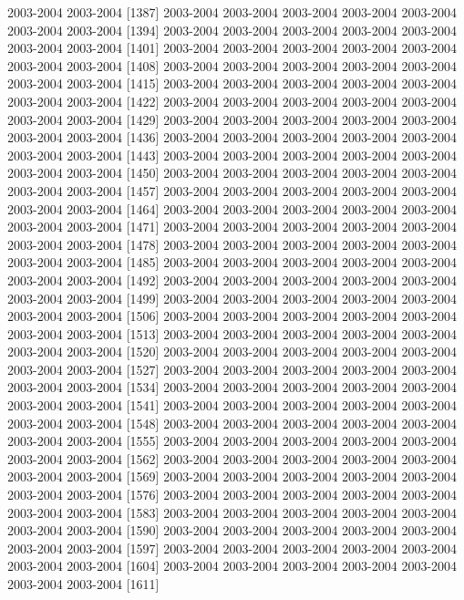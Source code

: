\documentclass[
]{article}
\begin{document}
2003-2004 2003-2004 {[}1387{]} 2003-2004 2003-2004 2003-2004 2003-2004
2003-2004 2003-2004 2003-2004 {[}1394{]} 2003-2004 2003-2004 2003-2004
2003-2004 2003-2004 2003-2004 2003-2004 {[}1401{]} 2003-2004 2003-2004
2003-2004 2003-2004 2003-2004 2003-2004 2003-2004 {[}1408{]} 2003-2004
2003-2004 2003-2004 2003-2004 2003-2004 2003-2004 2003-2004 {[}1415{]}
2003-2004 2003-2004 2003-2004 2003-2004 2003-2004 2003-2004 2003-2004
{[}1422{]} 2003-2004 2003-2004 2003-2004 2003-2004 2003-2004 2003-2004
2003-2004 {[}1429{]} 2003-2004 2003-2004 2003-2004 2003-2004 2003-2004
2003-2004 2003-2004 {[}1436{]} 2003-2004 2003-2004 2003-2004 2003-2004
2003-2004 2003-2004 2003-2004 {[}1443{]} 2003-2004 2003-2004 2003-2004
2003-2004 2003-2004 2003-2004 2003-2004 {[}1450{]} 2003-2004 2003-2004
2003-2004 2003-2004 2003-2004 2003-2004 2003-2004 {[}1457{]} 2003-2004
2003-2004 2003-2004 2003-2004 2003-2004 2003-2004 2003-2004 {[}1464{]}
2003-2004 2003-2004 2003-2004 2003-2004 2003-2004 2003-2004 2003-2004
{[}1471{]} 2003-2004 2003-2004 2003-2004 2003-2004 2003-2004 2003-2004
2003-2004 {[}1478{]} 2003-2004 2003-2004 2003-2004 2003-2004 2003-2004
2003-2004 2003-2004 {[}1485{]} 2003-2004 2003-2004 2003-2004 2003-2004
2003-2004 2003-2004 2003-2004 {[}1492{]} 2003-2004 2003-2004 2003-2004
2003-2004 2003-2004 2003-2004 2003-2004 {[}1499{]} 2003-2004 2003-2004
2003-2004 2003-2004 2003-2004 2003-2004 2003-2004 {[}1506{]} 2003-2004
2003-2004 2003-2004 2003-2004 2003-2004 2003-2004 2003-2004 {[}1513{]}
2003-2004 2003-2004 2003-2004 2003-2004 2003-2004 2003-2004 2003-2004
{[}1520{]} 2003-2004 2003-2004 2003-2004 2003-2004 2003-2004 2003-2004
2003-2004 {[}1527{]} 2003-2004 2003-2004 2003-2004 2003-2004 2003-2004
2003-2004 2003-2004 {[}1534{]} 2003-2004 2003-2004 2003-2004 2003-2004
2003-2004 2003-2004 2003-2004 {[}1541{]} 2003-2004 2003-2004 2003-2004
2003-2004 2003-2004 2003-2004 2003-2004 {[}1548{]} 2003-2004 2003-2004
2003-2004 2003-2004 2003-2004 2003-2004 2003-2004 {[}1555{]} 2003-2004
2003-2004 2003-2004 2003-2004 2003-2004 2003-2004 2003-2004 {[}1562{]}
2003-2004 2003-2004 2003-2004 2003-2004 2003-2004 2003-2004 2003-2004
{[}1569{]} 2003-2004 2003-2004 2003-2004 2003-2004 2003-2004 2003-2004
2003-2004 {[}1576{]} 2003-2004 2003-2004 2003-2004 2003-2004 2003-2004
2003-2004 2003-2004 {[}1583{]} 2003-2004 2003-2004 2003-2004 2003-2004
2003-2004 2003-2004 2003-2004 {[}1590{]} 2003-2004 2003-2004 2003-2004
2003-2004 2003-2004 2003-2004 2003-2004 {[}1597{]} 2003-2004 2003-2004
2003-2004 2003-2004 2003-2004 2003-2004 2003-2004 {[}1604{]} 2003-2004
2003-2004 2003-2004 2003-2004 2003-2004 2003-2004 2003-2004 {[}1611{]}
\end{document}
